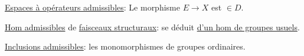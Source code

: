 \uline{Espaces à opérateurs admissibles}: Le morphisme $E\to X$ est $\in D$.

\uline{Hom admissibles} de  \uline{faisceaux structuraux}: se déduit \uline{d'un hom de groupes usuels}.

 \uline{Inclusions admissibles}: les monomorphismes de groupes ordinaires.
